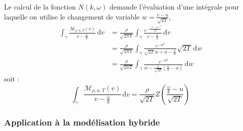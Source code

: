 Le calcul de la fonction $N(k,\omega)$ demande l'évaluation d'une intégrale pour laquelle on utilise le changement de variable $w = \frac{v-u}{\sqrt{2T}}$,
$$
  \begin{aligned}
    \int_\gamma \frac{\mathcal{M}_{\rho,u,T}(v)}{v-\frac{\omega}{k}}\,\mathrm{d}v
      & = \frac{\rho}{\sqrt{2\pi T}}\int_\gamma \frac{e^{-\frac{(v-u)^2}{2T}}}{v-\frac{\omega}{k}}\,\mathrm{d}v \\
      & = \frac{\rho}{\sqrt{2\pi T}}\int_\gamma \frac{e^{-w^2}}{\sqrt{2T}w + u - \frac{\omega}{k}}\sqrt{2T}\,\mathrm{d}w \\
      & = \frac{\rho}{\sqrt{2\pi T}}\int_\gamma \frac{e^{-w^2}}{w - \frac{1}{\sqrt{2T}}\left(\frac{\omega}{k}-u\right)}\,\mathrm{d}w
  \end{aligned}
$$  
soit :
\begin{equation}
  \int_\gamma \frac{\mathcal{M}_{\rho,u,T}(v)}{v-\frac{\omega}{k}}\,\mathrm{d}v
    = \frac{\rho}{\sqrt{2T}}Z\left(\frac{\frac{\omega}{k}-u}{\sqrt{2T}}\right)
  \label{eq:NforM}
\end{equation}


\subsubsection{Application à la modélisation hybride}

